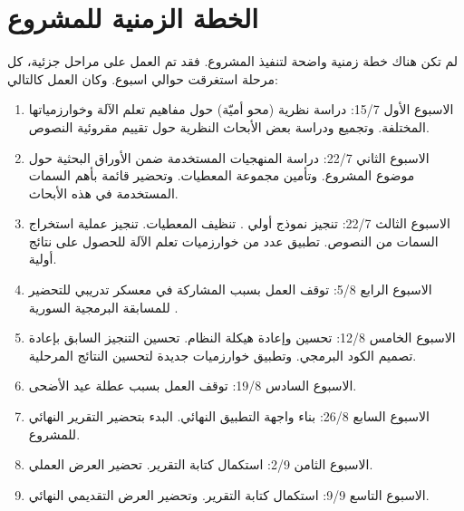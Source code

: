 \section{الخطة الزمنية للمشروع}
لم تكن هناك خطة زمنية واضحة لتنفيذ المشروع.
فقد تم العمل على مراحل جزئية، كل مرحلة استغرقت حوالي اسبوع.
وكان العمل كالتالي:
\begin{enumerate}
	\item 
	الاسبوع الأول 15/7:
	دراسة نظرية (محو أميّة) حول مفاهيم تعلم الآلة وخوارزمياتها المختلفة.
	وتجميع ودراسة بعض الأبحاث النظرية حول تقييم مقروئية النصوص.
	\item
	الاسبوع الثاني 22/7:
	دراسة المنهجيات المستخدمة ضمن الأوراق البحثية حول موضوع المشروع.
	وتأمين مجموعة المعطيات.
	وتحضير قائمة بأهم السمات المستخدمة في هذه الأبحاث.
	\item
	الاسبوع الثالث 22/7:
	تنجيز نموذج أولي .
	تنظيف المعطيات.
	تنجيز عملية استخراج السمات من النصوص.
	تطبيق عدد من خوارزميات تعلم الآلة للحصول على نتائج أولية.
	\item
	الاسبوع الرابع 5/8:
	توقف العمل بسبب المشاركة في معسكر تدريبي للتحضير للمسابقة البرمجية السورية .
	\item
	الاسبوع الخامس 12/8:
	تحسين وإعادة هيكلة النظام.
	تحسين التنجيز السابق بإعادة تصميم الكود البرمجي.
	وتطبيق خوارزميات جديدة لتحسين النتائج المرحلية.
	\item
	الاسبوع السادس 19/8:
	توقف العمل بسبب عطلة عيد الأضحى.
	\item
	الاسبوع السابع 26/8:
	بناء واجهة التطبيق النهائي.
	البدء بتحضير التقرير النهائي للمشروع.
	\item
	الاسبوع الثامن 2/9:
	استكمال كتابة التقرير.
	تحضير العرض العملي.
	\item
	الاسبوع التاسع 9/9:
	استكمال كتابة التقرير.
	وتحضير العرض التقديمي النهائي.
\end{enumerate}








